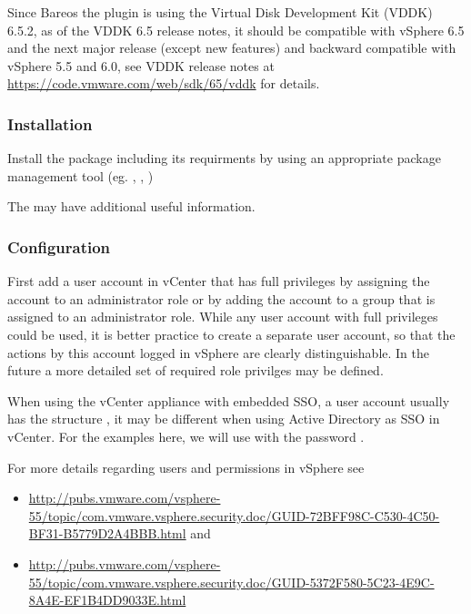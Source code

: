 Since Bareos  the plugin is using
the Virtual Disk Development Kit (VDDK) 6.5.2, as of the VDDK 6.5 release notes, it
should be compatible with vSphere 6.5 and the next major release (except new features)
and backward compatible with vSphere 5.5 and 6.0, see VDDK release notes at
\url{https://code.vmware.com/web/sdk/65/vddk} for details.

\subsubsection{Installation}

Install the package  including its requirments
by using an appropriate package management tool
(eg. , , )

The  may have additional
useful information.

\subsubsection{Configuration}

First add a user account in vCenter that has full privileges by assigning
the account to an administrator role or by adding the account to a group
that is assigned to an administrator role. While any user account
with full privileges could be used, it is better practice to create a separate
user account, so that the actions by this account logged in vSphere are clearly
distinguishable. In the future a more detailed set of required role privilges
may be defined.

When using the vCenter appliance with embedded SSO, a user account usually has the
structure , it may be different when using
Active Directory as SSO in vCenter. For the examples here, we will use
 with the password .

For more details regarding users and permissions in vSphere see
\begin{itemize}
    \item \url{http://pubs.vmware.com/vsphere-55/topic/com.vmware.vsphere.security.doc/GUID-72BFF98C-C530-4C50-BF31-B5779D2A4BBB.html} and
    \item \url{http://pubs.vmware.com/vsphere-55/topic/com.vmware.vsphere.security.doc/GUID-5372F580-5C23-4E9C-8A4E-EF1B4DD9033E.html}
\end{itemize}

